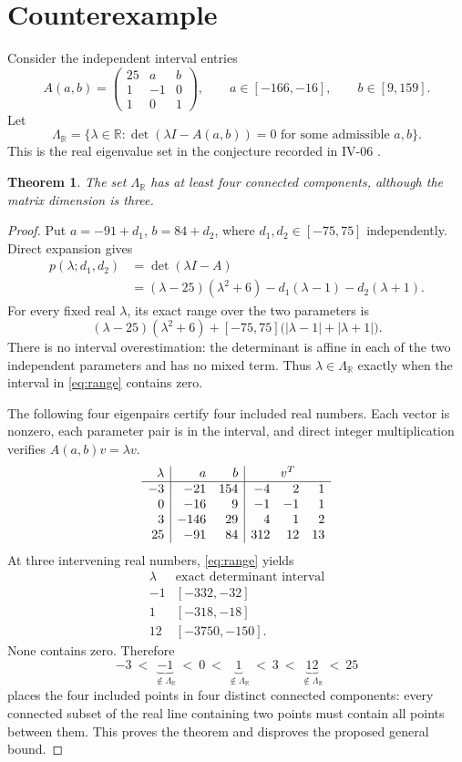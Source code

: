 \documentclass[11pt,a4paper]{article}
\newtheorem{theorem}{Theorem}
\theoremstyle{remark}\newtheorem{remark}[theorem]{Remark}
\newcommand{\R}{\mathbb R}
\begin{document}
\section{Counterexample}
Consider the independent interval entries
\[
 A(a,b)=\begin{pmatrix}25&a&b\\1&-1&0\\1&0&1\end{pmatrix},
 \qquad a\in[-166,-16],\qquad b\in[9,159].
\]
Let
\[
 \Lambda_{\R}=\{\lambda\in\R:\det(\lambda I-A(a,b))=0
                  \text{ for some admissible }a,b\}.
\]
This is the real eigenvalue set in the conjecture recorded in IV-06 \cite{repo}.
\begin{theorem}
The set $\Lambda_{\R}$ has at least four connected components, although the matrix dimension is three.
\end{theorem}
\begin{proof}
Put $a=-91+d_1$, $b=84+d_2$, where $d_1,d_2\in[-75,75]$ independently. Direct expansion gives
\begin{align*}
 p(\lambda;d_1,d_2)
 &=\det(\lambda I-A)\\
 &=(\lambda-25)(\lambda^2+6)-d_1(\lambda-1)-d_2(\lambda+1).
\end{align*}
For every fixed real $\lambda$, its exact range over the two parameters is
\begin{equation}\label{eq:range}
 (\lambda-25)(\lambda^2+6)
 +[-75,75]\bigl(|\lambda-1|+|\lambda+1|\bigr).
\end{equation}
There is no interval overestimation: the determinant is affine in each of the two independent parameters and has no mixed term. Thus $\lambda\in\Lambda_{\R}$ exactly when the interval in \eqref{eq:range} contains zero.

The following four eigenpairs certify four included real numbers. Each vector is nonzero, each parameter pair is in the interval, and direct integer multiplication verifies $A(a,b)v=\lambda v$.
\[
\begin{array}{r|r r|r r r}
 \lambda&a&b&\multicolumn{3}{c}{v^T}\\\hline
 -3&-21&154&-4&2&1\\
 0&-16&9&-1&-1&1\\
 3&-146&29&4&1&2\\
 25&-91&84&312&12&13
\end{array}
\]
At three intervening real numbers, \eqref{eq:range} yields
\[
\begin{array}{r|r}
 \lambda&\text{exact determinant interval}\\\hline
 -1&[-332,-32]\\
 1&[-318,-18]\\
 12&[-3750,-150].
\end{array}
\]
None contains zero. Therefore
\[
 -3\ <\ \underbrace{-1}_{\notin\Lambda_{\R}}\ <\ 0\ <\
 \underbrace{1}_{\notin\Lambda_{\R}}\ <\ 3\ <\
 \underbrace{12}_{\notin\Lambda_{\R}}\ <\ 25
\]
places the four included points in four distinct connected components: every connected subset of the real line containing two points must contain all points between them. This proves the theorem and disproves the proposed general bound.
\end{proof}
\end{document}

